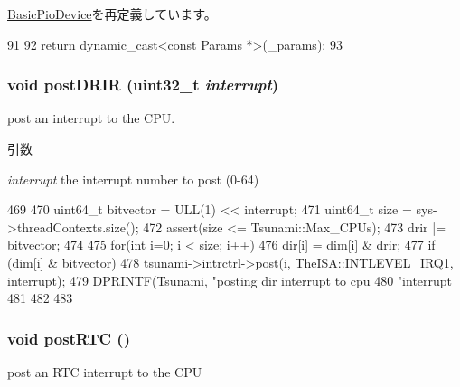 \hyperlink{classBasicPioDevice_acd3c3feb78ae7a8f88fe0f110a718dff}{BasicPioDevice}を再定義しています。


\begin{DoxyCode}
91     {
92         return dynamic_cast<const Params *>(_params);
93     }
\end{DoxyCode}
\hypertarget{classTsunamiCChip_a2a04c83ef42523f729c8c5ad75ffa3ea}{
\subsubsection[{postDRIR}]{\setlength{\rightskip}{0pt plus 5cm}void postDRIR ({\bf uint32\_\-t} {\em interrupt})}}
\label{classTsunamiCChip_a2a04c83ef42523f729c8c5ad75ffa3ea}
post an interrupt to the CPU. 
\begin{DoxyParams}{引数}
\item[{\em interrupt}]the interrupt number to post (0-\/64) \end{DoxyParams}



\begin{DoxyCode}
469 {
470     uint64_t bitvector = ULL(1) << interrupt;
471     uint64_t size = sys->threadContexts.size();
472     assert(size <= Tsunami::Max_CPUs);
473     drir |= bitvector;
474 
475     for(int i=0; i < size; i++) {
476         dir[i] = dim[i] & drir;
477        if (dim[i] & bitvector) {
478               tsunami->intrctrl->post(i, TheISA::INTLEVEL_IRQ1, interrupt);
479               DPRINTF(Tsunami, "posting dir interrupt to cpu %
480                         "interrupt %
481        }
482     }
483 }
\end{DoxyCode}
\hypertarget{classTsunamiCChip_acdd7f639bc4c5a8d164d48a96734d6c1}{
\subsubsection[{postRTC}]{\setlength{\rightskip}{0pt plus 5cm}void postRTC ()}}
\label{classTsunamiCChip_acdd7f639bc4c5a8d164d48a96734d6c1}
post an RTC interrupt to the CPU 


